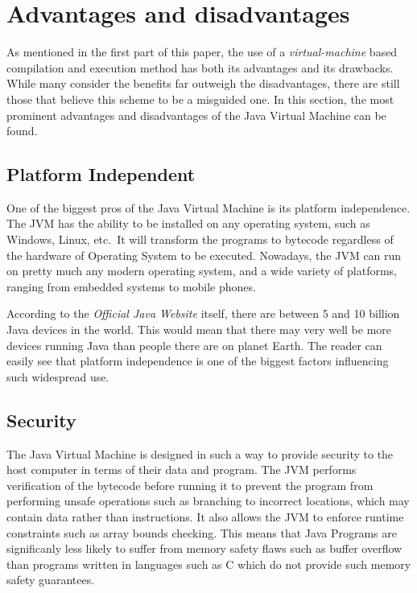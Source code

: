 \documentclass[english,runningheads,a4paper]{llncs}[2018/03/10]
\begin{document}
\section*{Advantages and disadvantages}
As mentioned in the first part of this paper, the use of a
\textit{virtual-machine} based compilation and execution method has both its
advantages and its drawbacks. While many consider the benefits far outweigh the
disadvantages, there are still those that believe this scheme to be a misguided one.
In this section, the most prominent advantages and disadvantages of the Java
Virtual Machine can be found. \parencite{jvmspec}

\subsection*{Platform Independent}
One of the biggest pros of the Java Virtual Machine is its platform
independence. The JVM has the ability to be installed on any operating system,
such as Windows, Linux, etc.\ It will transform the programs to bytecode
regardless of the hardware of Operating System to be executed. Nowadays, the JVM
can run on pretty much any modern operating system, and a wide variety of
platforms, ranging from embedded systems to mobile phones.

According to the \textit{Official Java Website} \parencite{gojava} itself, there are between 5 and
10 billion Java devices in the world. This would mean that there may very well
be more devices running Java than people there are on planet Earth. The reader
can easily see that platform independence is one of the biggest factors
influencing such widespread use.

\subsection*{Security}
The Java Virtual Machine is designed in such a way to provide security to the
host computer in terms of their data and program. The JVM performs verification
of the bytecode before running it to prevent the program from performing unsafe
operations such as branching to incorrect locations, which may contain data
rather than instructions. It also allows the JVM to enforce runtime constraints
such as array bounds checking. This means that Java Programs are significanly
less likely to suffer from memory safety flaws such as buffer overflow than
programs written in languages such as C which do not provide such memory safety
guarantees.
\end{document}
